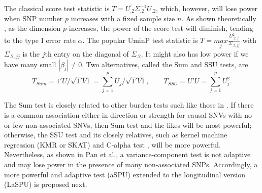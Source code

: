 \documentclass[12pt]{article}
\begin{document}
%

The classical score test statistic is $T=U_{.2}^{'}\Sigma_{.2}^{-1}U_{.2}$, which, however, will lose power when SNP number $p$ increases with a fixed sample size $n$. As shown theoretically \cite{Fan1996}, as the dimension $p$ increases, the power of the score test will diminish, tending to the type I error rate $\alpha$. The popular UminP test statistic is $T=\underset{j}{max}\frac{U_{.2,j}^{2}}{\Sigma_{.2,jj}}$ with $\Sigma_{.2,jj}$ is the $j$th entry on the diagonal of $\Sigma_{.2}$. It might also has low power if we have many small $|\beta_j| \neq 0$. Two alternatives, called the Sum and SSU tests, are
$$
T_{Sum} = 1' U / \sqrt{1' V 1} = \sum_{j=1}^p U_j / \sqrt{1' V 1}, \qquad T_{SSU} = U'U = \sum_{j=1}^p U_j^2.
$$

The Sum test is closely related to other burden tests such like those in \cite{Morgenthaler2007,Li2008,Madsen2009}. If there is a common association either in direction or strength for causal SNVs with no or few non-associated SNVs, then Sum test and the likes will be most powerful; otherwise, the SSU test and its closely relatives, such as kernel machine regression (KMR or SKAT) \cite{Lee2012,Ionita-Laza2013,Oualkacha2013,Lee2012a,Wu2011} and C-alpha test \cite{Neale2011}, will be more powerful. Nevertheless, as shown in Pan et al., \cite{Pan2015a,pan2014powerful} a variance-component test is not adaptive and may lose power in the presence of many non-associated SNPs. Accordingly, a more powerful and adaptive test (aSPU) extended to the longitudinal version (LaSPU) is proposed next.
\end{document}
